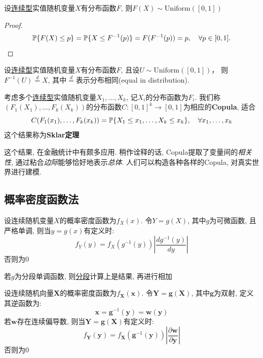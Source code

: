 \begin{theorem}
    设\underline{连续型}实值随机变量$X$有分布函数$F$, 则$F(X) \sim \mathrm{Uniform}([0,1])$
\end{theorem}

\begin{proof}
    \[ \P\{F(X)\le p\} = \P\{X\le F^{-1}(p)\} = F(F^{-1}(p)) =p, \quad \forall p \in [0,1]. \]
\end{proof}

\begin{theorem}
    设\underline{连续型}实值随机变量$X$有分布函数$F$, 且设$U\sim\mathrm{Uniform}([0,1]) $， 则$ F^{-1}(U) \overset{d}{=} X$, 其中$\overset{d}{=}$表示分布相同(equal in distribution).
\end{theorem}

\begin{theorem}[Sklar定理]
    考虑多个\underline{连续型}实值随机变量$X_{1},\dots,X_{k}$, 记$X_{i}$的分布函数为$F_{i}$. 我们称$(F_{1}(X_{1}),\dots,F_{k}(X_{k}))$的分布函数$C : [0,1]^{k} \to [0,1]$为相应的\textbf{Copula}, 适合
    \[ C(F_{1}(x_{1}),\dots,F_{k}(x_{k})) = \P\{X_{1}\le x_{1},\dots,X_{k}\le x_{k}\}, \quad \forall x_{1},\dots,x_{k} \]
    这个结果称为\textbf{Sklar定理}
\end{theorem}


这个结果, 在金融统计中有颇多应用. 稍作诠释的话, Copula提取了变量间的\emph{相关性}, 通过粘合\emph{边际}能够恰好地表示\emph{总体}.
人们可以构造各种各样的Copula, 对真实世界进行建模.

\subsection{概率密度函数法}

\begin{theorem}
    设连续随机变量$X$的概率密度函数为$f_X(x)$. 令$Y=g(X)$, 其中$g$为可微函数, 且严格单调, 则当$y=g(x)$有定义时:
    \[ f_Y(y)=f_X(g^{-1}(y))\left| \frac{dg^{-1}(y)}{dy} \right|  \]
    否则为$0$

    若$g$为分段单调函数, 则\underline{分段}计算上是结果, 再进行相加
\end{theorem}

\begin{theorem}
    设连续随机向量$\mathbf{X}$的概率密度函数为$f_\mathbf{X}(\mathbf{x})$. 令$\mathbf{Y}=\mathbf{g}(\mathbf{X})$, 其中$\mathbf{g}$为双射, 定义其逆函数为:
    \[ \mathbf{x}=\mathbf{g}^{-1}(\mathbf{y})=\mathbf{w}(\mathbf{y}) \]
    若$\mathbf{w}$存在连续偏导数, 则当$\mathbf{Y}=\mathbf{g}(\mathbf{X})$有定义时:
    \[ f_\mathbf{Y}(\mathbf{y})=f_\mathbf{X}(\mathbf{g}^{-1}(\mathbf{y}))\left| \frac{\partial \mathbf{w}}{\partial \mathbf{y}} \right|  \]
    否则为$0$
\end{theorem}

